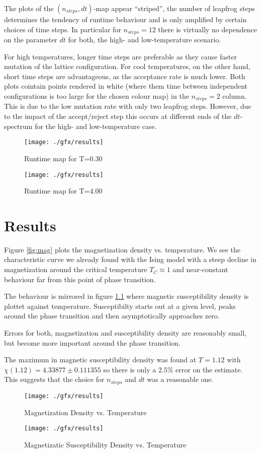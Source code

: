The plots of the $(n_{steps}, dt)$-map appear \enquote{striped}, \ie the number of leapfrog steps determines the tendency of runtime behaviour and is only amplified by certain choices of time steps. In particular for $n_{steps} = 12$ there is virtually no dependence on the parameter $dt$ for both, the high- and low-temperature scenario.

For high temperatures, longer time steps are preferable as they cause faster mutation of the lattice configuration. For cool temperatures, on the other hand, short time steps are advantageous, as the acceptance rate is much lower. Both plots cointain points rendered in white (\ie where them time between independent configurations is too large for the chosen colour map) in the $n_{steps} = 2$ column. This is due to the low mutation rate with only two leapfrog steps. However, due to the impact of the accept/reject step this occurs at different ends of the $dt$-spectrum for the high- and low-temperature case.

\begin{figure}
	\texttt{[image: ./gfx/results]}
	\caption{Runtime map for T=0.30} \label{fig:runtimeT1}
	\texttt{[image: ./gfx/results]}
	\caption{Runtime map for T=4.00} \label{fig:runtimeT4}
\end{figure}

\chapter{Results}
Figure \ref{fig:mag} plots the magnetization density vs. temperature. We see the characteristic curve we already found with the Ising model with a steep decline in magnetization around the critical temperature $T_C \approx 1$ and near-constant behaviour far from this point of phase transition.

The behaviour is mirrored in figure \ref{fig:chi} where magnetic susceptibility density is plottet against temperature. Susceptibilty starts out at a given level, peaks around the phase transition and then asymptotically approaches zero.

Errors for both, magnetization and susceptibility density are reasonably small, but become more important around the phase transition.

The maximum in magnetic susceptibility density was found at $T = 1.12$ with $\chi(1.12) = 4.33877 \pm 0.111355$ so there is only a $2.5\%$ error on the estimate. This suggests that the choice for $n_{steps}$ and $dt$ was a reasonable one.

\begin{figure}
	\texttt{[image: ./gfx/results]}
	\caption{Magnetization Density vs. Temperature} \label{fig:mag}
	\texttt{[image: ./gfx/results]}
	\caption{Magnetizatic Susceptibility Density vs. Temperature} \label{fig:chi}
\end{figure}